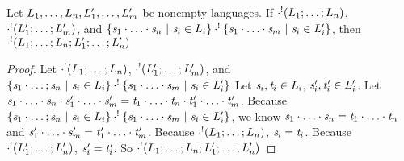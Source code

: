 \documentclass[numbers,10pt,preprint\ifanon ,nocopyrightspace\fi]{sigplanconf}
\begin{document}
\begin{lemma}
  \label{lem:potentially-empty-concat-implication}
  Let $L_1,\ldots,L_n,L_1',\ldots,L_m'$ be
  nonempty languages.
  If $\cdot^!(L_1;\ldots;L_n)$,
  $\cdot^!(L_1';\ldots;L_m')$, and
  $\{\mathit{s}_1\cdot\ldots\cdot\mathit{s}_n ~|~ \mathit{s}_i \in
    L_i\} \cdot^!
  \{\mathit{s}_1\cdot\ldots\cdot\mathit{s}_m ~|~ \mathit{s}_i \in
    L_i'\}$, then
  $\cdot^!(L_1;\ldots;L_n;L_1';\ldots;L_n')$
\end{lemma}
\begin{proof}
  Let $\cdot^!(L_1;\ldots;L_n)$,
  $\cdot^!(L_1';\ldots;L_m')$, and
  $\{\mathit{s}_1\cdot\ldots;\mathit{s}_n ~|~ \mathit{s}_i \in
    L_i\} \cdot^!
  \{\mathit{s}_1\cdot\ldots\cdot\mathit{s}_m ~|~ \mathit{s}_i \in
    L_i'\}$
  Let $\mathit{s}_i,\mathit{t}_i\in L_i$,
  $\mathit{s}_i',\mathit{t}_i'\in L_i'$.
  Let
  $\mathit{s}_1\cdot\ldots\cdot\mathit{s}_n\cdot\mathit{s}_1'\cdot\ldots\cdot\mathit{s}_m'
  =
  \mathit{t}_1\cdot\ldots\cdot\mathit{t}_n\cdot\mathit{t}_1'\cdot\ldots\cdot\mathit{t}_m'$.
  Because $\{\mathit{s}_1\cdot\ldots;\mathit{s}_n ~|~ \mathit{s}_i \in
    L_i\} \cdot^!
  \{\mathit{s}_1\cdot\ldots\cdot\mathit{s}_m ~|~ \mathit{s}_i \in
    L_i'\}$, we know
  $\mathit{s}_1\cdot\ldots\cdot\mathit{s}_n =
  \mathit{t}_1\cdot\ldots\cdot\mathit{t}_n$ and
  $\mathit{s}_1'\cdot\ldots\cdot\mathit{s}_m' =
  \mathit{t}_1'\cdot\ldots\cdot\mathit{t}_m'$.
  Because $\cdot^!(L_1;\ldots;L_n)$,
  $\mathit{s}_i = \mathit{t}_i$.
  Because $\cdot^!(L_1';\ldots;L_n')$,
  $\mathit{s}_i' = \mathit{t}_i'$.
  So
  $\cdot^!(L_1;\ldots;L_n;L_1';\ldots;L_n')$
\end{proof}
\end{document}
